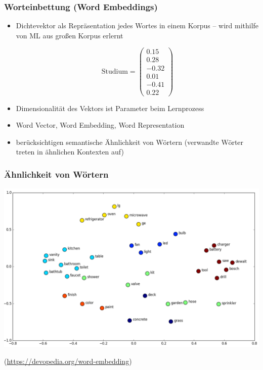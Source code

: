 
\begin{frame}
    \frametitle{Worteinbettung (Word Embeddings)}

 
        \begin{itemize}
        \item Dichtevektor als Repräsentation jedes Wortes in einem Korpus -- wird mithilfe von ML aus großen Korpus erlernt

        $$\text{Studium} = \left( \begin{array}{c}
        0.15 \\ 
        0.28 \\
        -0.32 \\ 
        0.01 \\
        -0.41 \\
        0.22 \end{array}
        \right)$$

        \item Dimensionalität des Vektors ist Parameter beim Lernprozess
        \item Word Vector, Word Embedding, Word Representation
        \item berücksichtigen semantische Ähnlichkeit von Wörtern (verwandte Wörter treten in ähnlichen Kontexten auf)
        \end{itemize}

\end{frame}



\begin{frame}
    \frametitle{Ähnlichkeit von Wörtern}

    \includegraphics[width=\linewidth]{fig8/wordembedding}
    
    {\tiny(\url{https://devopedia.org/word-embedding})}

\end{frame}

